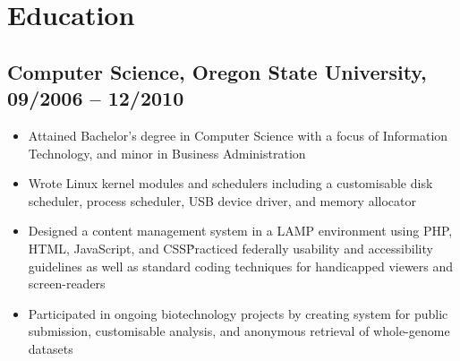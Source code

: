 \documentclass[a4paper,12pt]{report}
\begin{document}

\section*{Education}

\subsection*{Computer Science, Oregon State University, 09/2006 -- 12/2010}
\begin{itemize} \itemsep -0.25em
\item Attained Bachelor’s degree in Computer Science with a focus of Information Technology, and minor in Business Administration
\item Wrote Linux kernel modules and schedulers including a customisable disk scheduler, process scheduler, USB device driver, and memory allocator
\item Designed a content management system in a LAMP environment using PHP, HTML, JavaScript, and CSS\. Practiced federally usability and accessibility guidelines as well as standard coding techniques for handicapped viewers and screen-readers
\item Participated in ongoing biotechnology projects by creating system for public submission, customisable analysis, and anonymous retrieval of whole-genome datasets

\end{itemize}
\end{document}
